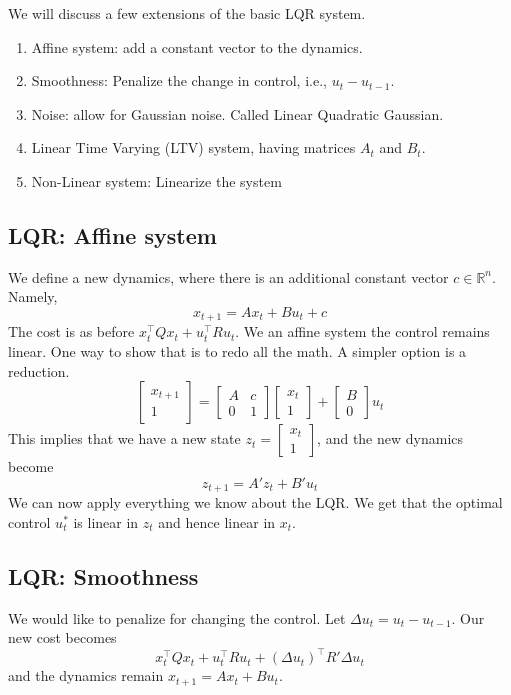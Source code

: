 We will discuss a few extensions of the basic LQR system.
\begin{enumerate}
\item
Affine system: add a constant vector to the dynamics.
\item
Smoothness: Penalize the change in control, i.e., $u_t-u_{t-1}$.
\item
Noise: allow for Gaussian noise. Called Linear Quadratic Gaussian.
\item
Linear Time Varying (LTV) system, having matrices $A_t$ and
$B_t$.
\item
Non-Linear system: Linearize the system
\end{enumerate}

\subsection{LQR: Affine system}

We define a new dynamics, where there is an additional constant
vector $c\in\mathbb{R}^n$. Namely,
\[
x_{t+1}=Ax_t+Bu_t+c
\]
The cost is as before $x_t^\top Qx_t+u_t^\top Ru_t$.  We an affine
system the control remains linear. One way to show that is to redo
all the math. A simpler option is a reduction.
\[
\begin{bmatrix}
x_{t+1}\\
1
\end{bmatrix}
=\begin{bmatrix}
A&c\\
0&1
\end{bmatrix}
\begin{bmatrix}
x_{t}\\
1
\end{bmatrix}+
\begin{bmatrix}
B\\
0
\end{bmatrix}
u_t
\]
This implies that we have a new state $z_t=\begin{bmatrix}
x_{t}\\
1
\end{bmatrix}$, and the new dynamics become
\[
z_{t+1}=A'z_t+B'u_t
\]
We can now apply everything we know about the LQR. We get that the
optimal control $u^*_t$ is linear in $z_t$ and hence linear in
$x_t$.

\subsection{LQR: Smoothness}

We would like to penalize for changing the control. Let $\Delta
u_t=u_t-u_{t-1}$. Our new cost becomes
\[
x^\top_t Qx_t +u_t^\top R u_t + (\Delta u_t)^\top R' \Delta u_t
\]
and the dynamics remain $x_{t+1}=A x_t + B u_t$.


